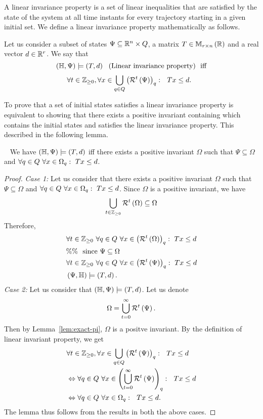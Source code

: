 A linear invariance property is a set of linear inequalities that are
satisfied by the state of the system at all time instants for every
trajectory starting in a given initial set.  We define a linear
invariance property mathematically as follows.  
%
\begin{definition}
Let us consider a subset of states
$\Psi\subseteq\mathbb{R}^n\times Q$, a matrix
$T\in\mathbb{M}_{r\times n}\left(\mathbb{R}\right)$ and a real vector $d\in\mathbb{R}^r$.  We
say that \[\left(\mathbb{H},\Psi\right)\models\left(T,d\right)~~\text{(Linear invariance property)}~~\text{iff}\] 
%
\begin{align*}\
& \forall t\in\mathbb{Z}_{\geq 0},\forall
 x\in\bigcup_{q\in Q}\left(\mathcal{R}^{t}\left(\Psi\right)\right)_q:~~
 Tx\leq d.
\end{align*}
%
\end{definition}
%
To prove that a set of initial states satisfies a linear invariance
property is equivalent to showing that there exists a positive
invariant containing which contains the initial states and satisfies
the linear invariance property.  This described in the following
lemma.
%
\begin{lemma}~\label{lem:pi-ver}
We have
$\left(\mathbb{H},\Psi\right)\models\left(T,d\right)$ iff there
exists a positive invariant $\Omega$ such that $\Psi\subseteq\Omega$
and $\forall q\in Q~\forall x\in\Omega_{q}:~Tx\leq d$.
\end{lemma}
%
\begin{proof}
{\it Case 1:} Let us consider that there exists a positive invariant
$\Omega$ such that $\Psi\subseteq\Omega$ and $\forall
q\in Q~\forall x\in\Omega_{q}:~Tx\leq d$.  Since
$\Omega$ is a positive invariant, we have
%
\[
\bigcup_{t\in\mathbb{Z}_{\geq 0}}\mathcal{R}^{t}\left(\Omega\right)\subseteq\Omega
\]
Therefore,
%
\begin{align*}
  & \forall t\in\mathbb{Z}_{\geq 0}~\forall q\in Q~\forall x\in\left(\mathcal{R}^{t}\left(\Omega\right)\right)_q:~Tx\leq d\\
  & \%\%~~\text{since}~\Psi\subseteq\Omega\\
  & \forall t\in\mathbb{Z}_{\geq 0}~\forall q\in Q~\forall x\in\left(\mathcal{R}^{t}\left(\Psi\right)\right)_{q}:~Tx\leq d\\
  & \left(\Psi,\mathbb{H}\right)\models\left(T,d\right).
\end{align*}
%
{\it Case 2:}  Let us consider that $\left(\mathbb{H},\Psi\right)\models\left(T,d\right)$.  Let us denote 
%
\[
\Omega=\bigcup_{t=0}^\infty\mathcal{R}^{t}\left(\Psi\right).
\]
% 
Then by Lemma~\ref{lem:exact-pi}, $\Omega$ is a positve invariant.  By
the definition of linear invariant property, we get 
%
\begin{align*}
& \forall t\in\mathbb{Z}_{\geq 0},\forall
 x\in\bigcup_{q\in Q}\left(\mathcal{R}^{t}\left(\Psi\right)\right)_q:~~
 Tx\leq d\\
 & \Leftrightarrow \forall q\in Q~\forall
x\in\left(\bigcup_{t=0}^\infty\mathcal{R}^{t}\left(\Psi\right)\right)_q:~~Tx\leq d\\
 & \Leftrightarrow \forall q\in Q~\forall
x\in\Omega_q:~~Tx\leq d.
\end{align*}
%
The lemma thus follows from the results in both the above cases.
\end{proof}
%
